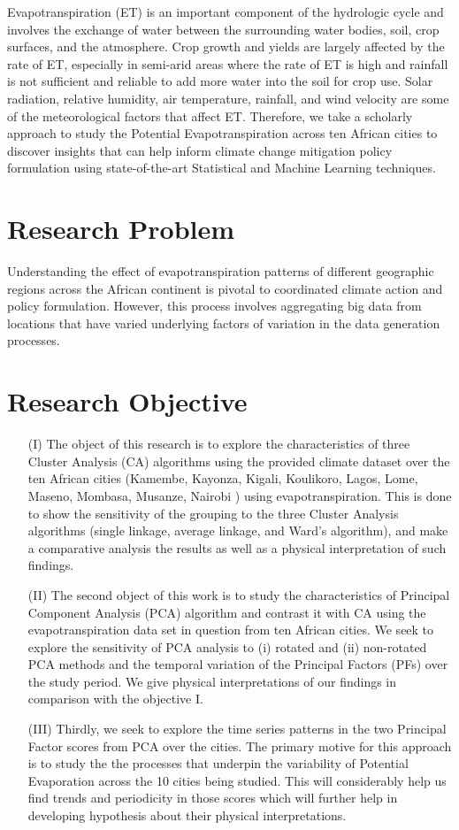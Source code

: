 \documentclass[12pt,a4paper]{article}
\begin{document}
Evapotranspiration (ET) is an important component of the hydrologic cycle and involves the exchange of water between the surrounding water bodies, soil, crop surfaces, and the atmosphere\cite{katul2012evapotranspiration}. Crop growth and yields are largely affected by the rate of ET, especially in semi-arid areas where the rate of ET is high and rainfall is not sufficient and reliable to add more water into the soil for crop use. Solar radiation, relative humidity, air temperature, rainfall, and wind velocity are some of the meteorological factors that affect ET.
Therefore, we take a scholarly approach to study the Potential Evapotranspiration across ten African cities to discover insights that can help inform climate change mitigation policy formulation using state-of-the-art Statistical and Machine Learning techniques.
\section{Research Problem}
Understanding the effect of evapotranspiration patterns of different geographic regions across the African continent is pivotal to coordinated climate action and policy formulation. However, this process involves aggregating big data from locations that have varied underlying factors of variation in the data generation processes.
\section{Research Objective}
\begin{enumerate}
\item[(I)] The object of this research is to explore the characteristics of three Cluster Analysis (CA) algorithms using the provided climate dataset over the ten African cities (Kamembe, Kayonza, Kigali, Koulikoro, Lagos, Lome, Maseno, Mombasa, Musanze, Nairobi ) using evapotranspiration.  
This is done to show the sensitivity of the grouping to the three Cluster Analysis algorithms (single linkage, average linkage,  and Ward’s algorithm), and make a comparative analysis the results as well as a physical interpretation of such findings.
\item[(II)] The second object of this work is to study the characteristics of Principal Component Analysis (PCA) algorithm and contrast it with CA using the evapotranspiration data set in question from ten African cities.  We seek to explore the sensitivity
of PCA analysis to (i) rotated and (ii) non-rotated PCA methods and the temporal variation of the  Principal Factors (PFs) over the study period.  We give physical interpretations of our findings in comparison with the objective I.
\item[(III)] Thirdly, we seek to explore the time series patterns in the two Principal Factor scores from PCA over the cities. The primary motive for this approach is to study the the processes that underpin the variability of Potential Evaporation across the 10 cities being studied. This will considerably help us find trends and periodicity in those scores which will further help in developing hypothesis about their physical interpretations.
\end{enumerate}
\end{document}
